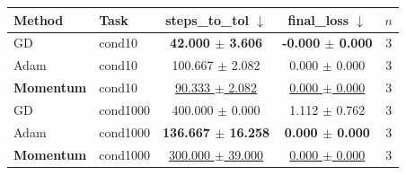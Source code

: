 \begin{tabular}{llccc}
\toprule
Method & Task & steps\_to\_tol $\downarrow$ & final\_loss $\downarrow$ & $n$ \\
\midrule
GD & cond10 & \textbf{42.000 $\pm$ 3.606} & \textbf{-0.000 $\pm$ 0.000} & 3 \\
Adam & cond10 & 100.667 $\pm$ 2.082 & 0.000 $\pm$ 0.000 & 3 \\
\textbf{Momentum} & cond10 & \underline{90.333 $\pm$ 2.082} & \underline{0.000 $\pm$ 0.000} & 3 \\
\midrule
GD & cond1000 & 400.000 $\pm$ 0.000 & 1.112 $\pm$ 0.762 & 3 \\
Adam & cond1000 & \textbf{136.667 $\pm$ 16.258} & \textbf{0.000 $\pm$ 0.000} & 3 \\
\textbf{Momentum} & cond1000 & \underline{300.000 $\pm$ 39.000} & \underline{0.000 $\pm$ 0.000} & 3 \\
\bottomrule
\end{tabular}

